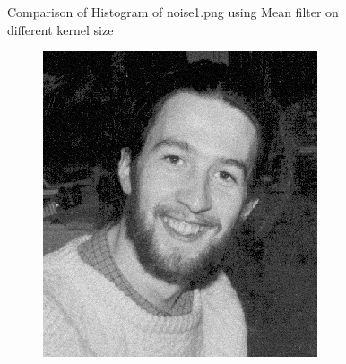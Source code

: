 \documentclass[12pt,a4paper]{report}
\begin{document}
\begin{figure}[!htb]
\begin{minipage}{\linewidth}
  \caption{Comparison of Histogram of noise1.png using Mean filter on different kernel size}
\label{fig:n1-median-hist}
\end{minipage}
\end{figure}
\begin{figure}[!htb]
  \begin{minipage}{\linewidth}
    \centering
    \begin{subfigure}{0.49\textwidth}
      \includegraphics[width=\linewidth]{test_img/noise2.png}
    \end{subfigure}
    \begin{subfigure}{0.49\textwidth}

\end{subfigure}
\end{minipage}
\end{figure}
\end{document}
